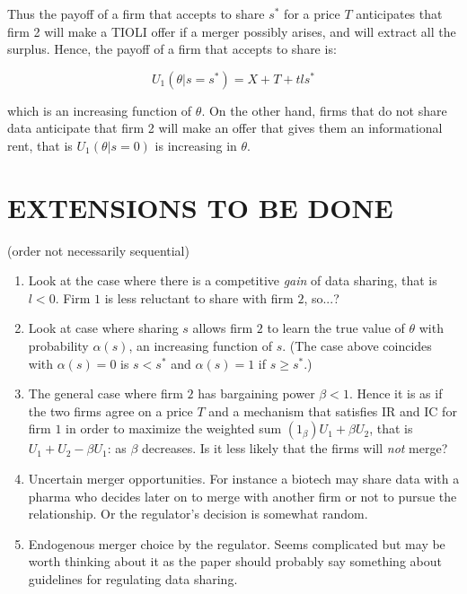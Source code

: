 \documentclass[a4paper]{article}
\renewcommand{\t}{\theta}
\begin{document}
Thus the payoff of a firm that accepts to share $s^*$ for a price $T$ anticipates that firm 2 will make a TIOLI offer if a merger possibly arises, and will extract all the surplus. Hence, the payoff of a firm that accepts to share is:


\[
U_1(\t|s=s^*)=X+T+t l s^*
\]

which is an increasing function of $\t$. On the other hand, firms that do not share data anticipate that firm 2 will make an offer that gives them an informational rent, that is $U_1(\t|s=0)$ is increasing in $\t$. 





\section{EXTENSIONS TO BE DONE}  
(order not necessarily sequential)
    \begin{enumerate}[TBD 1.]\setlength\itemsep{0em}
      \item Look at the case where there is a competitive \emph{gain} of data sharing, that is $l<0$. Firm $1$ is less reluctant to share with firm $2$, so...?
      \item Look at case where sharing $s$ allows firm $2$ to learn the true value of $\t$ with probability $\alpha(s)$, an increasing function of $s$. (The case above coincides with $\alpha(s)=0$ is $s<s^*$ and $\alpha(s)=1$ if $s\geq s^*$.)
      \item The general case where firm $2$ has bargaining power $\beta<1$. Hence it is as if the two firms agree on a price $T$ and a mechanism that satisfies IR and IC for firm $1$ in order to maximize the weighted sum $(1_\beta)U_1+\beta U_2$, that is $U_1+U_2-\beta U_1$: as $\beta$ decreases. Is it less likely that the firms will \emph{not} merge?
      \item Uncertain merger opportunities. For instance a biotech may share data with a pharma who decides later on to merge with another firm or not to pursue the relationship. Or the regulator's decision is somewhat random.
      \item Endogenous merger choice by the regulator. Seems complicated but may be worth thinking about it as the paper should probably say something about guidelines for regulating data sharing.
    \end{enumerate}



\end{document}
